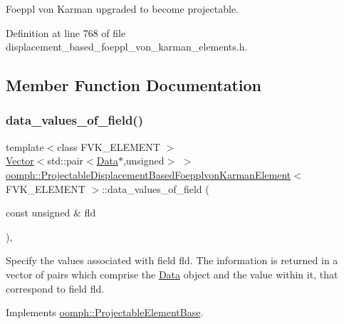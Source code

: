 Foeppl von Karman upgraded to become projectable. 

Definition at line 768 of file displacement\+\_\+based\+\_\+foeppl\+\_\+von\+\_\+karman\+\_\+elements.\+h.



\subsection{Member Function Documentation}
\mbox{\label{classoomph_1_1ProjectableDisplacementBasedFoepplvonKarmanElement_a18725fa9db7ade75bc789396bb91a04a}} 
\subsubsection{\texorpdfstring{data\+\_\+values\+\_\+of\+\_\+field()}{data\_values\_of\_field()}}
{\footnotesize\ttfamily template$<$class F\+V\+K\+\_\+\+E\+L\+E\+M\+E\+NT $>$ \\
\hyperlink{classoomph_1_1Vector}{Vector}$<$std\+::pair$<$\hyperlink{classoomph_1_1Data}{Data}$\ast$,unsigned$>$ $>$ \hyperlink{classoomph_1_1ProjectableDisplacementBasedFoepplvonKarmanElement}{oomph\+::\+Projectable\+Displacement\+Based\+Foepplvon\+Karman\+Element}$<$ F\+V\+K\+\_\+\+E\+L\+E\+M\+E\+NT $>$\+::data\+\_\+values\+\_\+of\+\_\+field (\begin{DoxyParamCaption}\item[{const unsigned \&}]{fld }\end{DoxyParamCaption})\hspace{0.3cm}{\ttfamily [inline]}, {\ttfamily [virtual]}}



Specify the values associated with field fld. The information is returned in a vector of pairs which comprise the \hyperlink{classoomph_1_1Data}{Data} object and the value within it, that correspond to field fld. 



Implements \hyperlink{classoomph_1_1ProjectableElementBase_a644306ebdf16f334344c2d27d72f18b7}{oomph\+::\+Projectable\+Element\+Base}.



